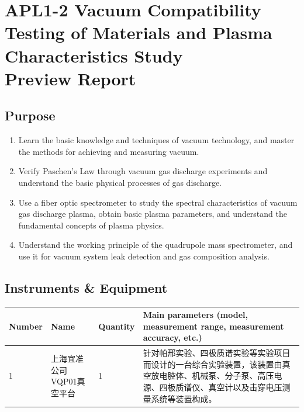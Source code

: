 
\setcounter{section}{0}
\section{APL1-2 Vacuum Compatibility Testing of Materials and Plasma Characteristics Study \\ Preview Report}


\subsection{Purpose}
\begin{enumerate}
	\item Learn the basic knowledge and techniques of vacuum technology, and master the methods for achieving and measuring vacuum.
	
	\item Verify Paschen's Law through vacuum gas discharge experiments and understand the basic physical processes of gas discharge.
	
	\item Use a fiber optic spectrometer to study the spectral characteristics of vacuum gas discharge plasma, obtain basic plasma parameters, and understand the fundamental concepts of plasma physics.
	
	\item Understand the working principle of the quadrupole mass spectrometer, and use it for vacuum system leak detection and gas composition analysis.
\end{enumerate}


\subsection{Instruments \& Equipment}
\begin{table}[htbp]
	\centering
	\renewcommand\arraystretch{1.6}
	\begin{tabular}{|p{}|p{}|p{}|p{}|}
		\hline
		Number & Name & Quantity & Main parameters (model, measurement range, measurement accuracy, etc.) \\
		\hline
		1 & 上海宜准公司VQP01真空平台 & 1 & 针对帕邢实验、四极质谱实验等实验项目而设计的一台综合实验装置，该装置由真空放电腔体、机械泵、分子泵、高压电源、四极质谱仪、真空计以及击穿电压测量系统等装置构成。 \\
		\hline
	\end{tabular}
\end{table}


